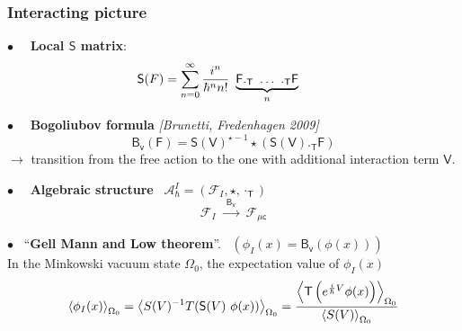 \documentclass[9pt]{beamer}
\newcommand{\Tdot}{\cdot_\Tsf} %
\newcommand{\Smearip}[1]{\left\langle #1 \right\rangle} %
\newcommand{\citebeam}[1]{\textit{\textcolor{black!60!white}{[#1]}}} %
\newcommand{\Acal}{\mathcal{A}}
\newcommand{\Fcal}{\mathcal{F}}
\newcommand{\Bsf}{\mathsf{B}}
\newcommand{\Fsf}{\mathsf{F}}
\newcommand{\Ssf}{\mathsf{S}}
\newcommand{\Tsf}{\mathsf{T}}
\newcommand{\Vsf}{\mathsf{V}}
\newcommand{\csf}{\mathsf{c}}
\newcommand{\vsf}{\mathsf{v}}
\begin{document}
\begin{frame}

\frametitle{Interacting picture}

\vfill

$\bullet \quad$ \textbf{Local $\Ssf$ matrix}:
\vspace*{-17pt}
\begin{equation*}
 \hspace*{-25pt} \Ssf(F) = \sum_{n=0}^{\infty} \frac{i^n}{\hbar^n n!} \ \underbrace{\Fsf ._\Tsf \ \dots \ ._\Tsf \Fsf}_{n}
\end{equation*}

\vfill

$\bullet \quad$ \textbf{Bogoliubov formula} \citebeam{Brunetti, Fredenhagen 2009} \\[-10pt]
\begin{equation*}
 \Bsf_\vsf(\Fsf) = \Ssf(\Vsf)^{\star -1} \star \left( \Ssf(\Vsf) ._{\Tsf} \Fsf \right) 
\end{equation*}
$\to$  transition from the free action to the one with additional interaction term $\Vsf$.

\vfill

$\bullet \quad$ \textbf{Algebraic structure} \ $\Acal^I_\hbar = \left( \Fcal_{I} , \star , \Tdot \right)$
\begin{equation*}
\Fcal_{I} \ \overset{\ \ \Bsf_\vsf \ \ }{\longrightarrow} \ \Fcal_{\mu \csf}
\end{equation*}

\vfill

$\bullet$ \ ``\textbf{Gell Mann and Low theorem}''. \ $\left( \phi_I(x) = \Bsf_\vsf(\phi(x)) \right)$ \\

\hspace*{9pt} In the Minkowski vacuum state $\Omega_0$, the expectation value of $\phi_I(x)$
\vspace*{-6pt}
\begin{equation*}
\Smearip{ \phi_I(x) }_{\Omega_0} 
= 
\Smearip{ S(V)^{-1} T( \Ssf(V) \ \phi(x)) }_{\Omega_0} 
= 
\frac{%
\Smearip{ \Tsf\left(e^{\frac{i}{\hbar} V} \phi(x) \right) }_{\Omega_0}
}{%
\left\langle S(V) \right\rangle_{\Omega_0}
}
\end{equation*}

\end{frame}  

\end{document}
